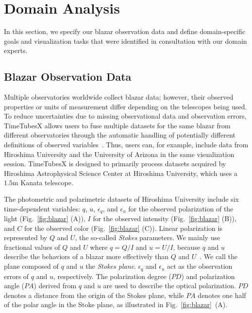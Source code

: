 \section{Domain Analysis}\label{sec:domainAnalysis}
In this section, we specify our blazar observation data and define domain-specific goals and visualization tasks that were identified in consultation with our domain experts. 

\subsection{Blazar Observation Data}\label{sec:BlazarData}
Multiple observatories worldwide collect blazar data; however, their observed properties or units of measurement differ depending on the telescopes being used. 
To reduce uncertainties due to missing observational data and observation errors,
TimeTubesX allows users to fuse multiple datasets for the same blazar from different observatories 
through the automatic handling of potentially different definitions of observed variables~\cite{Fujishiro2018}.
Thus, users can, for example, include data from Hiroshima University and the University of Arizona in the same visualization session. 
TimeTubesX is designed to primarily process datasets acquired by Hiroshima Astrophysical Science Center at Hiroshima University,
which uses a $1.5\mathrm{m}$ Kanata telescope. 

The photometric and polarimetric datasets of Hiroshima University include six time-dependent variables: $q$, $u$, $\epsilon_q$, and $\epsilon_u$ for the observed polarization of the light (Fig.~\ref{fig:blazar} (A)), $I$ for the observed intensity (Fig.~\ref{fig:blazar} (B)), and $C$ for the observed color (Fig.~\ref{fig:blazar} (C)).
Linear polarization is represented by $Q$ and $U$, the so-called \textit{Stokes} parameters.
We mainly use fractional values of $Q$ and $U$ where $q = Q / I$ and $u = U / I$, 
because $q$ and $u$ describe the behaviors of a blazar more effectively than $Q$ and $U$~\cite{Uemura2016}.
We call the plane composed of $q$ and $u$ the \textit{Stokes plane}.
$\epsilon_q$ and $\epsilon_u$ act as the observation errors of $q$ and $u$, respectively.
The polarization degree ($PD$) and polarization angle ($PA$) derived from $q$ and $u$ are used to describe the optical polarization.
$PD$ denotes a distance from the origin of the Stokes plane, 
while $PA$ denotes one half of the polar angle in the Stoke plane, as illustrated in Fig.~\ref{fig:blazar}~(A).

